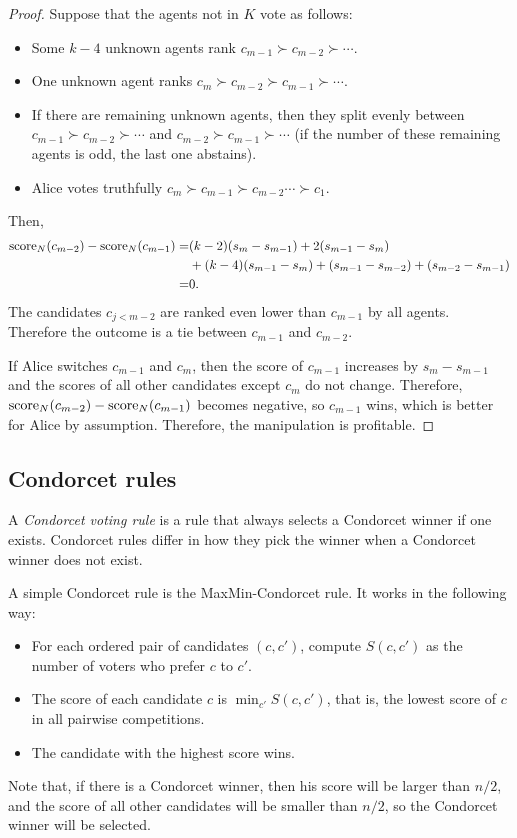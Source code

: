 \begin{proof}
Suppose that the agents not in $K$ vote as follows:
\begin{itemize}
\item Some $k-4$ unknown agents
rank $c_{m-1}\succ c_{m-2}\succ \cdots $.
\item One unknown agent ranks $c_m \succ c_{m-2} \succ c_{m-1}\succ \cdots $.
\item If there are remaining unknown
agents, then they split evenly between 
$c_{m-1}\succ c_{m-2}\succ \cdots $ and $c_{m-2}\succ c_{m-1}\succ \cdots $ 
(if the number of these remaining agents is odd, the last one abstains).
\item Alice votes truthfully $c_m\succ c_{m-1}\succ c_{m-2} \cdots \succ c_1$.
\end{itemize}
Then,
\begin{align*}
\operatorname{score}_N(c_{m-2}) - \operatorname{score}_N(c_{m-1})
=&
(k-2)(s_{m}-s_{m-1}) 
+ 2(s_{m-1}-s_{m})
\\
&+
(k-4)(s_{m-1}-s_{m}) 
+ (s_{m-1}-s_{m-2})
+ (s_{m-2}-s_{m-1})
\\
=&
0.
\end{align*}
The candidates $c_{j<m-2}$ are ranked even lower than $c_{m-1}$ by all agents. Therefore the outcome is a tie between $c_{m-1}$ and $c_{m-2}$.

If Alice switches $c_{m-1}$ and $c_m$, then the score of $c_{m-1}$ increases by $s_m-s_{m-1}$ and the scores of all other candidates except $c_m$ do not change. Therefore, 
$\operatorname{score}_N(c_{m-2}) - \operatorname{score}_N(c_{m-1})$ becomes negative, so $c_{m-1}$ wins, which is better for Alice by assumption.
Therefore, the manipulation is profitable.
\end{proof}
\fi






\iffalse
\subsection{Condorcet rules}
A \emph{Condorcet voting rule} is a rule that always selects a Condorcet winner if one exists. Condorcet rules differ in how they pick the winner when a Condorcet winner does not exist.

A simple Condorcet rule is the MaxMin-Condorcet rule. It works in the following way:
\begin{itemize}
\item For each ordered pair of candidates $(c,c')$, compute $S(c,c')$ as the number of voters who prefer $c$ to $c'$.
\item The score of each candidate $c$ is $\min_{c'} S(c,c')$, that is, the lowest score of $c$ in all pairwise competitions.
\item The candidate with the highest score wins. 
\end{itemize}
Note that, if there is a Condorcet winner, then his score will be larger than $n/2$, and the score of all other candidates will be smaller than $n/2$, so the Condorcet winner will be selected.

